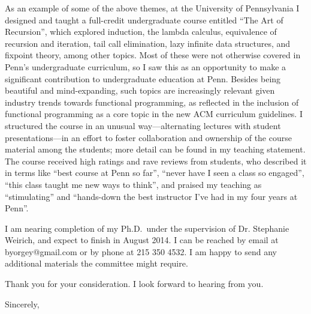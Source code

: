 \begin{letter}{\thereaddress}
{  As an example of some of the above themes, at the University of
  Pennsylvania I designed and taught a full-credit undergraduate
  course entitled ``The Art of Recursion'', which explored induction,
  the lambda calculus, equivalence of recursion and iteration, tail
  call elimination, lazy infinite data structures, and fixpoint
  theory, among other topics.  Most of these were not otherwise
  covered in Penn's undergraduate curriculum, so I saw this as an
  opportunity to make a significant contribution to undergraduate
  education at Penn.  Besides being beautiful and mind-expanding, such
  topics are increasingly relevant given industry trends towards
  functional programming, as reflected in the inclusion of functional
  programming as a core topic in the new ACM curriculum guidelines.  I
  structured the course in an unusual way---alternating lectures with
  student presentations---in an effort to foster collaboration and
  ownership of the course material among the students; more detail can
  be found in my teaching statement.  The course received high ratings
  and rave reviews from students, who described it in terms like
  ``best course at Penn so far'', ``never have I seen a class so
  engaged'', ``this class taught me new ways to think'', and praised
  my teaching as ``stimulating'' and ``hands-down the best instructor
  I've had in my four years at Penn''.

} %

\placespecific

I am nearing completion of my Ph.D.\ under the supervision of
Dr. Stephanie Weirich, and expect to finish in August 2014.  I can be reached by email at \textsf{byorgey@gmail.com} or
by phone at \textsf{215 350 4532}.  I am happy to send any additional materials
the committee might require.

Thank you for your consideration.  I look forward to hearing from you.

\closing{Sincerely,}

\end{letter}


